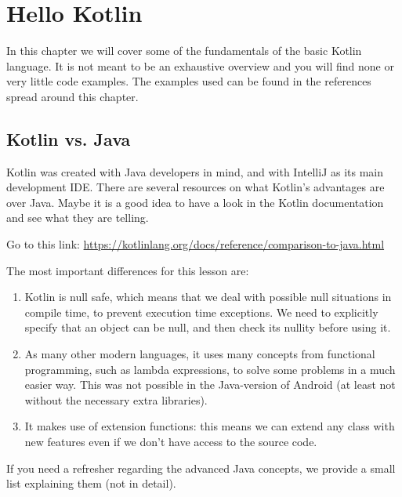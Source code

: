 
\chapter{Hello Kotlin}
In this chapter we will cover some of the fundamentals of the basic Kotlin language.
It is not meant to be an exhaustive overview and you will find none or very little code examples.
The examples used can be found in the references spread around this chapter.

\section{Kotlin vs. Java}

Kotlin was created with Java developers in mind, and with IntelliJ as its main development IDE.
There are several resources on what Kotlin's advantages are over Java.
Maybe it is a good idea to have a look in the Kotlin documentation and see what they are telling.

Go to this link: \url{https://kotlinlang.org/docs/reference/comparison-to-java.html}

The most important differences for this lesson are:

\begin{enumerate}
	\item Kotlin is null safe, which means that we deal with possible null situations in compile time, to prevent execution time exceptions.
		We need to explicitly specify that an object can be null, and then check its nullity before	using it.
	\item As many other modern languages, it uses many concepts from functional programming, such as lambda expressions, to solve some problems in a much easier way.
		This was not possible in the Java-version of Android (at least not without the necessary extra libraries).
	\item It makes use of extension functions: this means we can extend any class with new features even if we don’t have access to the source code.
\end{enumerate}

If you need a refresher regarding the advanced Java concepts, we provide a small list explaining them (not in detail).

